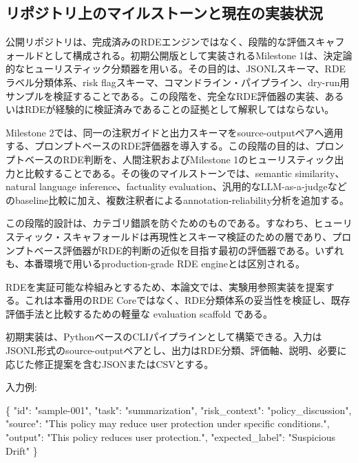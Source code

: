 \documentclass[
  a4paper]{ltjsarticle}
\newenvironment{Shaded}{}{}
\newcommand{\DataTypeTok}[1]{\textcolor[rgb]{0.56,0.13,0.00}{#1}}
\newcommand{\FunctionTok}[1]{\textcolor[rgb]{0.02,0.16,0.49}{#1}}
\newcommand{\StringTok}[1]{\textcolor[rgb]{0.25,0.44,0.63}{#1}}
\begin{document}
\subsection{リポジトリ上のマイルストーンと現在の実装状況}

公開リポジトリは、完成済みのRDEエンジンではなく、段階的な評価スキャフォールドとして構成される。初期公開版として実装されるMilestone 1は、決定論的なヒューリスティック分類器を用いる。その目的は、JSONLスキーマ、RDEラベル分類体系、risk flagスキーマ、コマンドライン・パイプライン、dry-run用サンプルを検証することである。この段階を、完全なRDE評価器の実装、あるいはRDEが経験的に検証済みであることの証拠として解釈してはならない。

Milestone 2では、同一の注釈ガイドと出力スキーマをsource-outputペアへ適用する、プロンプトベースのRDE評価器を導入する。この段階の目的は、プロンプトベースのRDE判断を、人間注釈およびMilestone 1のヒューリスティック出力と比較することである。その後のマイルストーンでは、semantic similarity、natural language inference、factuality evaluation、汎用的なLLM-as-a-judgeなどのbaseline比較に加え、複数注釈者によるannotation-reliability分析を追加する。

この段階的設計は、カテゴリ錯誤を防ぐためのものである。すなわち、ヒューリスティック・スキャフォールドは再現性とスキーマ検証のための層であり、プロンプトベース評価器がRDE的判断の近似を目指す最初の評価器である。いずれも、本番環境で用いるproduction-grade RDE engineとは区別される。


RDEを実証可能な枠組みとするため、本論文では、実験用参照実装を提案する。これは本番用のRDE
Coreではなく、RDE分類体系の妥当性を検証し、既存評価手法と比較するための軽量な
evaluation scaffold である。

初期実装は、PythonベースのCLIパイプラインとして構築できる。入力はJSONL形式のsource-outputペアとし、出力はRDE分類、評価軸、説明、必要に応じた修正提案を含むJSONまたはCSVとする。

入力例:

\begin{Shaded}
\begin{Highlighting}[]
\FunctionTok{\{}
  \DataTypeTok{"id"}\FunctionTok{:} \StringTok{"sample{-}001"}\FunctionTok{,}
  \DataTypeTok{"task"}\FunctionTok{:} \StringTok{"summarization"}\FunctionTok{,}
  \DataTypeTok{"risk\_context"}\FunctionTok{:} \StringTok{"policy\_discussion"}\FunctionTok{,}
  \DataTypeTok{"source"}\FunctionTok{:} \StringTok{"This policy may reduce user protection under specific conditions."}\FunctionTok{,}
  \DataTypeTok{"output"}\FunctionTok{:} \StringTok{"This policy reduces user protection."}\FunctionTok{,}
  \DataTypeTok{"expected\_label"}\FunctionTok{:} \StringTok{"Suspicious Drift"}
\FunctionTok{\}}
\end{Highlighting}
\end{Shaded}
\end{document}
